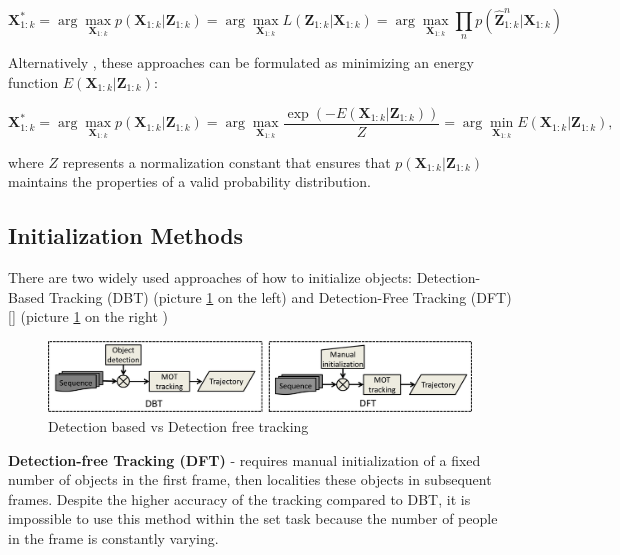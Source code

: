 \documentclass[12pt, a4paper]{article}
\begin{document}
\begin{equation}
\mathbf{X}_{1:k}^* = \arg\max_{\mathbf{X}_{1:k}} p(\mathbf{X}_{1:k}|\mathbf{Z}_{1:k}) = \arg\max_{\mathbf{X}_{1:k}} L(\mathbf{Z}_{1:k}|\mathbf{X}_{1:k}) = \arg\max_{\mathbf{X}_{1:k}} \prod_n p(\hat{\mathbf{Z}}^n_{1:k}|\mathbf{X}_{1:k})
\end{equation}

Alternatively \cite{lit-review}, these approaches can be formulated as minimizing an energy function $E(\mathbf{X}_{1:k}|\mathbf{Z}_{1:k})$:

\begin{equation}
\mathbf{X}_{1:k}^* = \arg\max_{\mathbf{X}_{1:k}} p(\mathbf{X}_{1:k}|\mathbf{Z}_{1:k}) = \arg\max_{\mathbf{X}_{1:k}} \frac{\exp(-E(\mathbf{X}_{1:k}|\mathbf{Z}_{1:k}))}{Z} = \arg\min_{\mathbf{X}_{1:k}} E(\mathbf{X}_{1:k}|\mathbf{Z}_{1:k}),
\end{equation}

where $Z$ represents a normalization constant that ensures that $p(\mathbf{X}_{1:k}|\mathbf{Z}_{1:k})$ maintains the properties of a valid probability distribution.

\subsection{Initialization Methods}
There are two  widely used approaches of how to initialize objects: Detection-Based Tracking (DBT) (picture \ref{fig:dftdbt} on the left) and Detection-Free Tracking (DFT)[\cite{DFT_pipe}] (picture \ref{fig:dftdbt} on the right )

\begin{figure}[h]
    \centering
    \includegraphics[width=0.95\linewidth]{pictures/DBT_DFT.jpg}
    \caption{Detection based vs Detection free tracking}
    \label{fig:dftdbt}
\end{figure}

\textbf{Detection-free Tracking (DFT)} - requires manual initialization of a fixed number of objects in the first frame, 
then localities these objects in subsequent frames.  Despite the higher accuracy of the tracking compared to DBT, it is impossible to use this method within the set task because the number of people in the frame is constantly varying.
\end{document}
